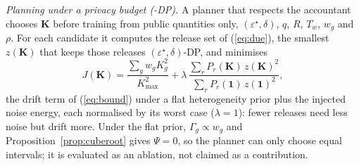 \emph{Planning under a privacy budget (\tierfed{}-DP).} A planner that respects the accountant chooses $\mathbf K$ before training from public quantities only, $(\varepsilon^\star,\delta)$, $q$, $R$, $T_w$, $w_g$ and $\rho$. For each candidate it computes the release set of (\ref{eq:due}), the smallest $z(\mathbf K)$ that keeps those releases $(\varepsilon^\star,\delta)$-DP, and minimises
\begin{equation}
J(\mathbf K)=\frac{\sum_g w_gK_g^2}{K_{\max}^2}+\lambda\,\frac{\sum_{r}P_r(\mathbf K)\,z(\mathbf K)^2}{\sum_{r}P_r(\mathbf 1)\,z(\mathbf 1)^2},
\label{eq:jdp}
\end{equation}
the drift term of (\ref{eq:bound}) under a flat heterogeneity prior plus the injected noise energy, each normalised by its worst case ($\lambda=1$): fewer releases need less noise but drift more. Under the flat prior, $\Gamma_g\propto w_g$ and Proposition~\ref{prop:cuberoot} gives $\Psi=0$, so the planner can only choose equal intervals; it is evaluated as an ablation, not claimed as a contribution.
